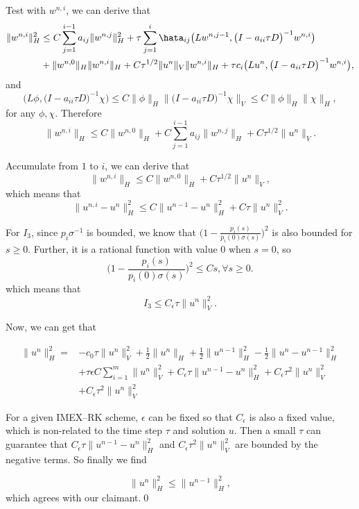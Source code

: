 Test with $w^{n,i}$, we can derive that 
\begin{align*}\|w^{n,i}\|_H^2 &\leq C \sum\limits_{j=1}^{i-1}a_{ij}\|w^{n,j}\|_H^2 
+ \tau \sum\limits_{j=1}^i\hata_{ij}\big(Lw^{n,j-1},\big(I-a_{ii}\tau D\big)^{-1} w^{n,i} \big)\\
&+ \|w^{n,0}\|_H\|w^{n,i}\|_H + C\tau^{1/2} \|u^n\|_V\|w^{n,i}\|_H+ \tau c_i\big(Lu^n, \big(I-a_{ii}\tau D\big)^{-1}w^{n,i}\big),
\end{align*}
and
$$\big(L\phi,\big(I-a_{ii}\tau D\big)^{-1} \chi \big) 
\leq C\|\phi\|_H\|\big(I-a_{ii}\tau D\big)^{-1} \chi\|_V
\leq C\|\phi\|_H\|\chi\|_H,$$
for any $\phi, \chi$. 
Therefore
$$\|w^{n,i}\|_H \leq C \|w^{n,0}\|_H + C \sum\limits_{j=1}^{i-1}a_{ij}\|w^{n,j}\|_H+C \tau^{1/2}\|u^n\|_V.$$

Accumulate from $1$ to $i$, we can derive that
$$\|w^{n,i}\|_H \leq C \|w^{n,0}\|_H + C \tau^{1/2}\|u^n\|_V,$$
which means that
$$\|u^{n,i}-u^n\|_H^2 \leq C \|u^{n-1}-u^n\|_H^2 + C \tau\|u^n\|_V^2.$$

For $I_3$, since $p_i\sigma^{-1}$ is bounded, we know that $\Big(1 -\frac{p_i(s)}{p_i(0)\sigma(s)}\Big)^2$
is also bounded for $s\geq 0$. Further, it is a rational function with value $0$ when $s = 0$, so
$$\bigg(1 -\frac{p_i(s)}{p_i(0)\sigma(s)}\bigg)^2 \leq Cs, \forall s \geq 0.$$
which means that
$$I_3 \leq C_\epsilon\tau \big\|u^n\big\|_V^2.$$

Now, we can get that

\begin{align*}
    \big\|u^n\big\|_H^2 =& - c_0\tau\big\|u^n\big\|_V^2 + \frac12\big\|u^n\big\|_H+\frac12\big\|u^{n-1}\big\|_H^2-\frac12\big\|u^n-u^{n-1}\big\|_H^2\\
    &+ \tau \epsilon C \sum_{i=1}^m\big\|u^n\big\|_V^2 + C_\epsilon\tau \|u^{n-1}-u^n\|_H^2 + C_\epsilon \tau^2\|u^n\|_V^2 \\
    &+ C_\epsilon\tau^2 \big\|u^n\big\|_V^2
\end{align*}

For a given IMEX--RK scheme, $\epsilon$ can be fixed so that $C_\epsilon$ is also a fixed value,
which is non-related to the time step $\tau$ and solution $u$.
Then a small $\tau$ can guarantee that
$C_\epsilon\tau \|u^{n-1}-u^n\|_H^2$ and $C_\epsilon\tau^2 \big\|u^n\big\|_V^2$ are bounded by the negative terms.
So finally we find

$$\big\|u^n\big\|_H^2 \leq  \big\|u^{n-1}\big\|_H^2, $$
which agrees with our claimant.\qed



